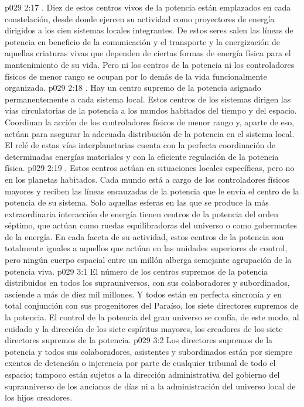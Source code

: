 \vs p029 2:17 . Diez de estos centros vivos de la potencia están emplazados en cada constelación, desde donde ejercen su actividad como proyectores de energía dirigidos a los cien sistemas locales integrantes. De estos seres salen las líneas de potencia en beneficio de la comunicación y el transporte y la energización de aquellas criaturas vivas que dependen de ciertas formas de energía física para el mantenimiento de su vida. Pero ni los centros de la potencia ni los controladores físicos de menor rango se ocupan por lo demás de la vida funcionalmente organizada.
\vs p029 2:18 . Hay un centro supremo de la potencia asignado permanentemente a cada sistema local. Estos centros de los sistemas dirigen las vías circulatorias de la potencia a los mundos habitados del tiempo y del espacio. Coordinan la acción de los controladores físicos de menor rango y, aparte de eso, actúan para asegurar la adecuada distribución de la potencia en el sistema local. El relé de estas vías interplanetarias cuenta con la perfecta coordinación de determinadas energías materiales y con la eficiente regulación de la potencia física.
\vs p029 2:19 . Estos centros actúan en situaciones locales específicas, pero no en los planetas habitados. Cada mundo está a cargo de los controladores físicos mayores y reciben las líneas encauzadas de la potencia que le envía el centro de la potencia de su sistema. Solo aquellas esferas en las que se produce la más extraordinaria interacción de energía tienen centros de la potencia del orden séptimo, que actúan como ruedas equilibradoras del universo o como gobernantes de la energía. En cada faceta de su actividad, estos centros de la potencia son totalmente iguales a aquellos que actúan en las unidades superiores de control, pero ningún cuerpo espacial entre un millón alberga semejante agrupación de la potencia viva.
\vs p029 3:1 El número de los centros supremos de la potencia distribuidos en todos los suprauniversos, con sus colaboradores y subordinados, asciende a más de diez mil millones. Y todos están en perfecta sincronía y en total conjunción con sus progenitores del Paraíso, los siete directores supremos de la potencia. El control de la potencia del gran universo se confía, de este modo, al cuidado y la dirección de los siete espíritus mayores, los creadores de los siete directores supremos de la potencia.
\vs p029 3:2 Los directores supremos de la potencia y todos sus colaboradores, asistentes y subordinados están por siempre exentos de detención o injerencia por parte de cualquier tribunal de todo el espacio; tampoco están sujetos a la dirección administrativa del gobierno del suprauniverso de los ancianos de días ni a la administración del universo local de los hijos creadores.
